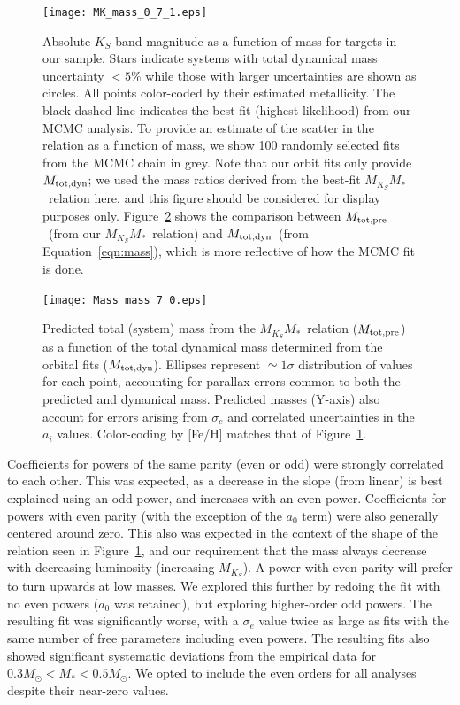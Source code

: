 \documentclass[twocolumn]{aastex62}
\newcommand{\mks}{$M_{K_S}$}
\newcommand{\mmk}{$M_{K_S}$\textendash$M_*$}
\newcommand{\mpred}{$M_{\rm{tot,pre}}$}
\newcommand{\mdyn}{$M_{\rm{tot,dyn}}$}
\begin{document}
\begin{figure}[htp]
\begin{center}
\texttt{[image: MK\_mass\_0\_7\_1.eps]}
\caption{Absolute $K_S$-band magnitude as a function of mass for targets in our sample. Stars indicate systems with total dynamical mass uncertainty $<5\%$ while those with larger uncertainties are shown as circles. All points color-coded by their estimated metallicity. The black dashed line indicates the best-fit (highest likelihood) from our MCMC analysis. To provide an estimate of the scatter in the relation as a function of mass, we show 100 randomly selected fits from the MCMC chain in grey. Note that our orbit fits only provide \mdyn; we used the mass ratios derived from the best-fit \mmk\ relation here, and this figure should be considered for display purposes only. Figure~\ref{fig:m_m} shows the comparison between \mpred\ (from our \mmk\ relation) and \mdyn\ (from Equation~\ref{eqn:mass}), which is more reflective of how the MCMC fit is done. }
\label{fig:relation}
\end{center}
\end{figure}

\begin{figure}[ht]
\begin{center}
\texttt{[image: Mass\_mass\_7\_0.eps]}
\caption{Predicted total (system) mass from the \mmk\ relation (\mpred) as a function of the total dynamical mass determined from the orbital fits (\mdyn). Ellipses represent $\simeq1\sigma$ distribution of values for each point, accounting for parallax errors common to both the predicted and dynamical mass. Predicted masses (Y-axis) also account for errors arising from $\sigma_e$ and correlated uncertainties in the $a_i$ values. Color-coding by [Fe/H] matches that of Figure~\ref{fig:relation}.}
\label{fig:m_m}
\end{center}
\end{figure}


Coefficients for powers of the same parity (even or odd) were strongly correlated to each other. This was expected, as a decrease in the slope (from linear) is best explained using an odd power, and increases with an even power. Coefficients for powers with even parity (with the exception of the $a_0$ term) were also generally centered around zero. This also was expected in the context of the shape of the relation seen in Figure~\ref{fig:relation}, and our requirement that the mass always decrease with decreasing luminosity (increasing \mks). A power with even parity will prefer to turn upwards at low masses. We explored this further by redoing the fit with no even powers ($a_0$ was retained), but exploring higher-order odd powers. The resulting fit was significantly worse, with a $\sigma_e$ value twice as large as fits with the same number of free parameters including even powers. The resulting fits also showed significant systematic deviations from the empirical data for $0.3M_\odot<M_*<0.5M_\odot$. We opted to include the even orders for all analyses despite their near-zero values. 
\end{document}
